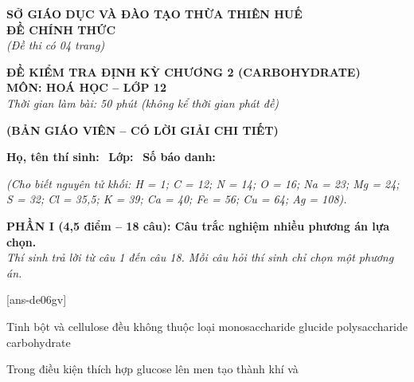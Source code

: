 \documentclass[12pt,a4paper]{article}
\begin{document}
\thispagestyle{firstpage}

\noindent
\begin{minipage}[t]{0.44\textwidth}
	\centering\fontsize{10pt}{12pt}\selectfont
	\textbf{SỞ GIÁO DỤC VÀ ĐÀO TẠO THỪA THIÊN HUẾ}\\
	\textbf{ĐỀ CHÍNH THỨC}\\
	\textit{(Đề thi có 04 trang)}
\end{minipage}\hfill
\begin{minipage}[t]{0.54\textwidth}
	\centering\small
	\textbf{ĐỀ KIỂM TRA ĐỊNH KỲ CHƯƠNG 2 (CARBOHYDRATE)}\\
	\textbf{MÔN: HOÁ HỌC -- LỚP 12}\\
	\textit{Thời gian làm bài: 50 phút (không kể thời gian phát đề)}\\
\end{minipage}

\smallskip
\begin{center}
	{\color{hfRed}\textbf{\large (BẢN GIÁO VIÊN -- CÓ LỜI GIẢI CHI TIẾT)}}
\end{center}

\smallskip
\noindent\hrulefill
\smallskip

\noindent\textbf{Họ, tên thí sinh:} \dotfill\ \textbf{Lớp:} \dotfill\ \textbf{Số báo danh:} \dotfill

\smallskip
\noindent\textit{(Cho biết nguyên tử khối: H = 1; C = 12; N = 14; O = 16; Na = 23; Mg = 24; S = 32; Cl = 35,5; K = 39; Ca = 40; Fe = 56; Cu = 64; Ag = 108).}

\vspace{0.15cm}
\noindent
\textbf{PHẦN I (4,5 điểm -- 18 câu): Câu trắc nghiệm nhiều phương án lựa chọn.}\\
\textit{Thí sinh trả lời từ câu 1 đến câu 18. Mỗi câu hỏi thí sinh chỉ chọn một phương án.}

[ans-de06gv]

\begin{ex}
Tinh bột và cellulose đều không thuộc loại
\choice
{\True monosaccharide}
{glucide}
{polysaccharide}
{carbohydrate}
\end{ex}

\begin{ex}
Trong điều kiện thích hợp glucose lên men tạo thành khí  và
\choice
{\True {}}
{}
{}
{}
\end{ex}
\end{document}
